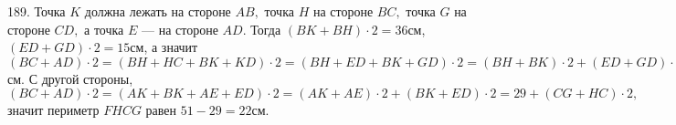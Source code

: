 189. Точка $K$ должна лежать на стороне $AB,$ точка $H$ на стороне $BC,$ точка $G$ на стороне $CD,$ а точка $E$ --- на стороне $AD.$ Тогда $(BK+BH)\cdot2=36$см, $(ED+GD)\cdot2=15$см, а значит $(BC+AD)\cdot2=(BH+HC+BK+KD)\cdot2=(BH+ED+BK+GD)\cdot2=(BH+BK)\cdot2+(ED+GD)\cdot2=36+15=51$см. С другой стороны, $(BC+AD)\cdot2=(AK+BK+AE+ED)\cdot2=(AK+AE)\cdot2+(BK+ED)\cdot2=29+(CG+HC)\cdot2,$ значит периметр $FHCG$ равен $51-29=22$см.\\
